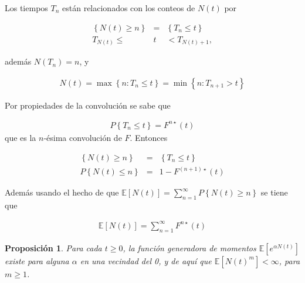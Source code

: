 \documentclass{article}
\newtheorem{Prop}{Proposición}[section]
\newcommand{\esp}{\mathbb{E}}
\numberwithin{equation}{section}
\begin{document}
%
%

Los tiempos $T_{n}$ est\'an relacionados con los conteos de $N\left(t\right)$ por

\begin{eqnarray*}
\left\{N\left(t\right)\geq n\right\}&=&\left\{T_{n}\leq t\right\}\\
T_{N\left(t\right)}\leq &t&<T_{N\left(t\right)+1},
\end{eqnarray*}

adem\'as $N\left(T_{n}\right)=n$, y 

\begin{eqnarray*}
N\left(t\right)=\max\left\{n:T_{n}\leq t\right\}=\min\left\{n:T_{n+1}>t\right\}
\end{eqnarray*}

Por propiedades de la convoluci\'on se sabe que

\begin{eqnarray*}
P\left\{T_{n}\leq t\right\}=F^{n\star}\left(t\right)
\end{eqnarray*}
que es la $n$-\'esima convoluci\'on de $F$. Entonces 

\begin{eqnarray*}
\left\{N\left(t\right)\geq n\right\}&=&\left\{T_{n}\leq t\right\}\\
P\left\{N\left(t\right)\leq n\right\}&=&1-F^{\left(n+1\right)\star}\left(t\right)
\end{eqnarray*}

Adem\'as usando el hecho de que $\esp\left[N\left(t\right)\right]=\sum_{n=1}^{\infty}P\left\{N\left(t\right)\geq n\right\}$
se tiene que

\begin{eqnarray*}
\esp\left[N\left(t\right)\right]=\sum_{n=1}^{\infty}F^{n\star}\left(t\right)
\end{eqnarray*}

\begin{Prop}
Para cada $t\geq0$, la funci\'on generadora de momentos $\esp\left[e^{\alpha N\left(t\right)}\right]$ existe para alguna $\alpha$ en una vecindad del 0, y de aqu\'i que $\esp\left[N\left(t\right)^{m}\right]<\infty$, para $m\geq1$.
\end{Prop}
\end{document}
